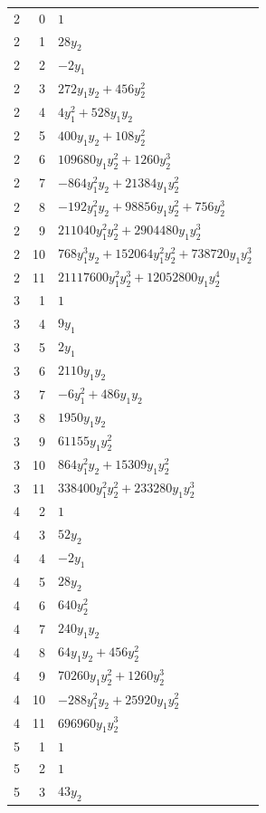 \documentclass[10pt,a4paper]{article}
\begin{document}
{\begin{longtable}{rrp{125mm}}
2 & 0 & $1$\\
2 & 1 & $28 y_{2}$\\
2 & 2 & $- 2 y_{1}$\\
2 & 3 & $272 y_{1} y_{2} + 456 y_{2}^{2}$\\
2 & 4 & $4 y_{1}^{2} + 528 y_{1} y_{2}$\\
2 & 5 & $400 y_{1} y_{2} + 108 y_{2}^{2}$\\
2 & 6 & $109680 y_{1} y_{2}^{2} + 1260 y_{2}^{3}$\\
2 & 7 & $- 864 y_{1}^{2} y_{2} + 21384 y_{1} y_{2}^{2}$\\
2 & 8 & $- 192 y_{1}^{2} y_{2} + 98856 y_{1} y_{2}^{2} + 756 y_{2}^{3}$\\
2 & 9 & $211040 y_{1}^{2} y_{2}^{2} + 2904480 y_{1} y_{2}^{3}$\\
2 & 10 & $768 y_{1}^{3} y_{2} + 152064 y_{1}^{2} y_{2}^{2} + 738720 y_{1} y_{2}^{3}$\\
2 & 11 & $21117600 y_{1}^{2} y_{2}^{3} + 12052800 y_{1} y_{2}^{4}$\\
3 & 1 & $1$\\
3 & 4 & $9 y_{1}$\\
3 & 5 & $2 y_{1}$\\
3 & 6 & $2110 y_{1} y_{2}$\\
3 & 7 & $- 6 y_{1}^{2} + 486 y_{1} y_{2}$\\
3 & 8 & $1950 y_{1} y_{2}$\\
3 & 9 & $61155 y_{1} y_{2}^{2}$\\
3 & 10 & $864 y_{1}^{2} y_{2} + 15309 y_{1} y_{2}^{2}$\\
3 & 11 & $338400 y_{1}^{2} y_{2}^{2} + 233280 y_{1} y_{2}^{3}$\\
4 & 2 & $1$\\
4 & 3 & $52 y_{2}$\\
4 & 4 & $- 2 y_{1}$\\
4 & 5 & $28 y_{2}$\\
4 & 6 & $640 y_{2}^{2}$\\
4 & 7 & $240 y_{1} y_{2}$\\
4 & 8 & $64 y_{1} y_{2} + 456 y_{2}^{2}$\\
4 & 9 & $70260 y_{1} y_{2}^{2} + 1260 y_{2}^{3}$\\
4 & 10 & $- 288 y_{1}^{2} y_{2} + 25920 y_{1} y_{2}^{2}$\\
4 & 11 & $696960 y_{1} y_{2}^{3}$\\
5 & 1 & $1$\\
5 & 2 & $1$\\
5 & 3 & $43 y_{2}$\\

\end{longtable}}
\end{document}
